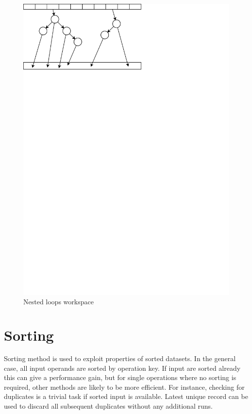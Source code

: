 \begin{figure}[H]
	\centering
	\includegraphics[scale=0.7,trim=0.25 23cm 8.95cm 0.1cm]{img/workspace}
	\caption{Nested loops workspace}
	\label{fig:workspace}
\end{figure}

\section{Sorting}

Sorting method is used to exploit properties of sorted datasets. In
the general case, all input operands are sorted by operation key. If
input are sorted already this can give a performance gain, but for
single operations where no sorting is required, other methods are
likely to be more efficient. For instance, checking for duplicates is
a trivial task if sorted input is available. Latest unique record can
be used to discard all subsequent duplicates without any additional
runs.

